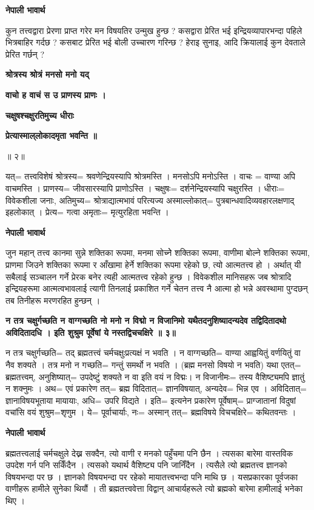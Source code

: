\documentclass[11pt, a5paper]{article}
\begin{document}
\textbf{नेपाली भावार्थ}

कुन तत्त्वद्वारा प्रेरणा प्राप्त गरेर मन विषयतिर उन्मुख हुन्छ ? कसद्वारा प्रेरित भई इन्द्रियव्यापारभन्दा पहिले भित्रबाहिर गर्दछ ? कसबाट प्रेरित भई बोली उच्चारण गरिन्छ ? हेराइ सुनाइ, आदि क्रियालाई कुन देवताले प्रेरित गर्छन् ?

\textbf{श्रोत्रस्य श्रोत्रं मनसो मनो यद्}

\textbf{वाचो ह वाचं स उ प्राणस्य प्राणः ।}

\textbf{चक्षुषश्चक्षुरतिमुच्य धीराः}

\textbf{प्रेत्यास्माल्‌लोकादमृता भवन्ति ॥}

॥ २॥

यत्= तत्त्वविशेषं श्रोत्रस्य= श्रवणेन्द्रियस्यापि श्रोत्रमस्ति । मनसोऽपि मनोऽस्ति । वाचः = वाण्या अपि वाचमस्ति ।  प्राणस्य= जीवसारस्यापि प्राणोऽस्ति । चक्षुषः= दर्शनेन्द्रियस्यापि चक्षुरस्ति । धीराः= विवेकशीला जनाः, अतिमुच्य= श्रोत्राद्यात्मभावं परित्यज्य अस्माल्लोकात्= पुत्रबान्धवादिव्यवहारलक्षणाद् इहलोकात् । प्रेत्य= गत्वा अमृताः= मृत्युरहिता भवन्ति ।

\textbf{नेपाली भावार्थ}

जुन महान् तत्त्व कानमा सुन्ने शक्तिका रूपमा, मनमा सोच्नेे शक्तिका रूपमा, वाणीमा बोल्ने शक्तिका रूपमा, प्राणमा जिउने शक्तिका रूपमा र आँखामा हेर्ने शक्तिका रूपमा रहेको छ, त्यो आत्मतत्त्व हो । अर्थात् यी सबैलाई सञ्चालन गर्ने प्रेरक बनेर त्यही आत्मतत्त्व रहेको हुन्छ । विवेकशील मानिसहरू जब श्रोत्रादि इन्द्रियहरूमा आत्मत्वभावलाई त्यागी तिनलाई प्रकाशित गर्ने चेतन तत्त्व नै आत्मा हो भन्ने अवस्थामा पुग्दछन् तब तिनीहरू मरणरहित हुन्छन् ।

\textbf{न तत्र चक्षुर्गच्छति न वाग्गच्छति नो मनो न विद्मो न विजानिमो यथैतदनुशिष्यादन्यदेव तद्विदितादथो अविदितादधि । इति शुश्रुम पूर्वेषां ये नस्तद्विचचक्षिरे ॥ ३॥}

न तत्र चक्षुर्गच्छति= तद् ब्रह्मतत्त्वं चर्मचक्षुःप्रत्यक्षं न भवति । न वाग्गच्छति= वाण्या आह्वयितुं वर्णयितुं वा नैव शक्यते । तत्र मनो न गच्छति= गन्तुं समर्थो न भवति । (ब्रह्म मनसो विषयो न भवति) यथा एतत्= ब्रह्मतत्त्वम्, अनुशिष्यात्= उपदेष्टुं शक्यते न वा इति वयं न विद्मः। न विजानीमः= तस्य वैशिष्ट्यमपि ज्ञातुं न शक्नुमः । अथ= एवं प्रकारेण तत्= ब्रह्म विदितात्= ज्ञानविषयात्, अन्यदेव= भिन्न एव । अविदितात्= ज्ञानाविषयभूताया मायायाः, अधि= उपरि विद्यते । इति= इत्यनेन प्रकारेण पूर्वेषाम्= प्राग्जातानां विदुषां वचांसि वयं शुश्रुम=शृणुम । ये= पूर्वाचार्याः, नः= अस्मान् तत्= ब्रह्मविषये विचचक्षिरे= कथितवन्तः ।

\textbf{नेपाली भावार्थ}

ब्रह्मतत्त्वलाई चर्मचक्षुले देख्न सक्दैन, त्यो वाणी र मनको पहुँचमा पनि छैन । त्यसका बारेमा वास्तविक उपदेश गर्न पनि सकिँदैन । त्यसको यथार्थ वैशिष्ट्य पनि जानिँदैन । त्यसैले त्यो ब्रह्मतत्त्व ज्ञानको विषयभन्दा पर छ । ज्ञानको विषयभन्दा पर रहेको मायातत्त्वभन्दा पनि माथि छ । यसप्रकारका पूर्वजका वाणीहरू हामीले सुनेका थियौं । ती ब्रह्मतत्त्ववेत्ता विद्वान् आचार्यहरूले त्यो ब्रह्मको बारेमा हामीलाई भनेका थिए ।
\end{document}
